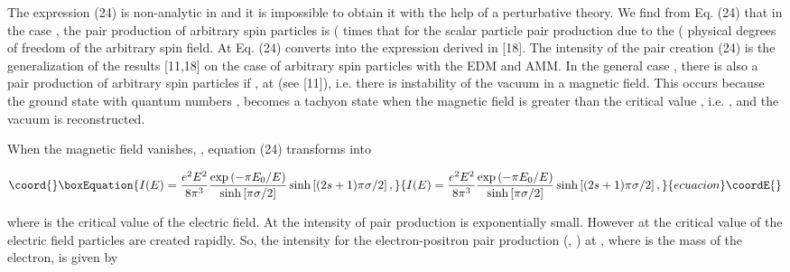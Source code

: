 \documentclass[a4paper,12pt]{article}
\begin{document}
The expression (24) is non-analytic in \coordHE{} and it is impossible to
obtain it with the help of a perturbative theory. We find from Eq.
(24) that in the case \coordHE{}, the pair production of
arbitrary spin particles is (\coordHE{} times that for the scalar
particle pair production due to the (\coordHE{} physical degrees of
freedom of the arbitrary spin field. At \coordHE{} Eq. (24)
converts into the expression derived in [18]. The intensity of the
pair creation (24) is the generalization of the results [11,18] on
the case of arbitrary spin particles with the EDM and AMM. In the
general case \coordHE{}, \coordHE{} there is also a pair
production of arbitrary spin particles if \coordHE{}, \coordHE{} at
\coordHE{} (see [11]), i.e. there is instability of the vacuum in a
magnetic field. This occurs because the ground state with quantum
numbers \coordHE{}, \coordHE{} becomes a tachyon state when the magnetic
field \coordHE{} is greater than the critical value \coordHE{}, i.e.
\coordHE{}, and the vacuum is reconstructed.

When the magnetic field vanishes, \coordHE{}, equation (24) transforms into

\begin{equation}\coord{}\boxEquation{
I(E)=\frac{e^2 E^2}{8\pi ^3} \frac{\exp \left( -\pi E_0/E \right)} {\sinh
\left[\pi \sigma/2 \right] }\sinh \left[ (2s+1)\pi \sigma /2 \right],
\label{25}
}{
I(E)=\frac{e^2 E^2}{8\pi ^3} \frac{\exp \left( -\pi E_0/E \right)} {\sinh
\left[\pi \sigma/2 \right] }\sinh \left[ (2s+1)\pi \sigma /2 \right],
}{ecuacion}\coordE{}\end{equation}

where \coordHE{} is the critical value of the electric field. At
\coordHE{} the intensity of pair production is exponentially small.
However at the critical value of the electric field \coordHE{}
particles are created rapidly. So, the intensity for the
electron-positron pair production (\coordHE{}, \coordHE{}) at
\coordHE{}, where \coordHE{} is the mass of the electron, is given by
\end{document}
